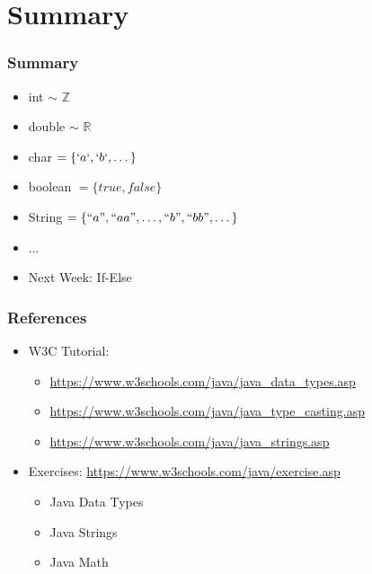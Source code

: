\documentclass{beamer}
\begin{document}
	\section{Summary}
	
	\begin{frame}
		\frametitle{Summary}
		\begin{itemize}
			\item int $\sim$ $\mathbb{Z}$
			\item double $\sim$ $\mathbb{R}$
			\item char $= \{`a`, `b`, \dots \}$
			\item boolean $= \{true, false\}$
			\item String $= \{``a", ``aa", \dots, ``b", ``bb", \dots \}$
			\item ...
		\end{itemize}
		\begin{itemize}
			\item Next Week: If-Else
		\end{itemize}
	\end{frame}

	\begin{frame}
		\frametitle{References}
		\begin{itemize}
			\item W3C Tutorial: 
			\begin{itemize}
				\item \url{https://www.w3schools.com/java/java\_data\_types.asp}
				\item \url{https://www.w3schools.com/java/java\_type\_casting.asp}
				\item \url{https://www.w3schools.com/java/java\_strings.asp}
			\end{itemize}
			\item Exercises: \url{https://www.w3schools.com/java/exercise.asp}
			\begin{itemize}
				\item Java Data Types
				\item Java Strings
				\item Java Math
			\end{itemize}
		\end{itemize}
	\end{frame}
\end{document}
